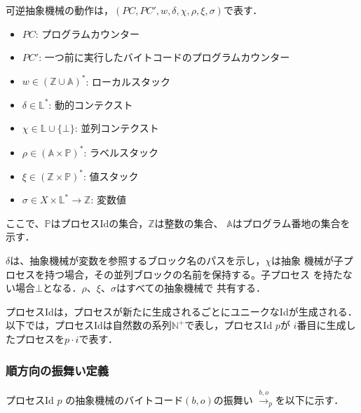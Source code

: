 \documentclass[submit,PRO]{ipsj}
\newtheorem{defn}[thm]{定義}
\begin{document}
可逆抽象機械の動作は，$(PC,PC',w,\delta,\chi,\rho,\xi,\sigma)$で表す．
\begin{itemize}
\item $PC$: プログラムカウンター
\item $PC'$: 一つ前に実行したバイトコードのプログラムカウンター
\item $w\in(\mathbb{Z}\cup\mathbb{A})^\ast$: ローカルスタック
\item $\delta\in\mathbb{L}^\ast$: 動的コンテクスト
\item $\chi\in \mathbb{L}\cup\{\bot\}$: 並列コンテクスト
\item $\rho\in(\mathbb{A}\times\mathbb{P})^\ast$: ラベルスタック
\item $\xi\in(\mathbb{Z}\times\mathbb{P})^\ast$: 値スタック
\item $\sigma\in X\times\mathbb{L}^\ast\rightarrow\mathbb{Z}$: 変数値	
\end{itemize}
ここで、$\mathbb{P}$はプロセスIdの集合，$\mathbb{Z}$は整数の集合、
$\mathbb{A}$はプログラム番地の集合を示す．

$\delta$は、抽象機械が変数を参照するブロック名のパスを示し，$\chi$は抽象
機械が子プロセスを持つ場合，その並列ブロックの名前を保持する。子プロセス
を持たない場合$\bot$となる．$\rho$、$\xi$、$\sigma$はすべての抽象機械で
共有する．

プロセスIdは，プロセスが新たに生成されるごとにユニークなIdが生成される．
以下では，プロセスIdは自然数の系列$\mathbb{N}^+$で表し，プロセスId $p$が
$i$番目に生成したプロセスを$p\cdot i$で表す．

\subsubsection{順方向の振舞い定義}

プロセスId $p$ の抽象機械のバイトコード$(b,o)$の振舞い
$\xrightarrow{b,o}_{p}$を以下に示す．
\end{document}
